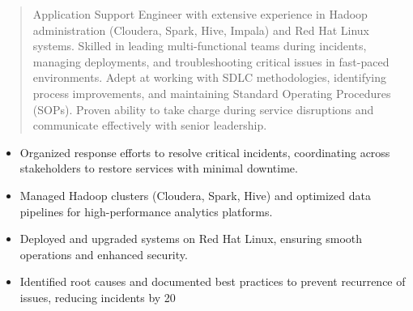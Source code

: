 



\makecvheader

\begin{quote}
  \noindent
  Application Support Engineer with extensive experience in Hadoop administration (Cloudera, Spark, Hive, Impala) and Red Hat Linux systems. Skilled in leading multi-functional teams during incidents, managing deployments, and troubleshooting critical issues in fast-paced environments. Adept at working with SDLC methodologies, identifying process improvements, and maintaining Standard Operating Procedures (SOPs). Proven ability to take charge during service disruptions and communicate effectively with senior leadership.
\end{quote}

\par\smallskip
\noindent
\begin{minipage}{20cm}
  \begin{minipage}{9.75cm}
    \begin{itemize}
      \item Organized response efforts to resolve critical incidents, coordinating across stakeholders to restore services with minimal downtime.
      \item Managed Hadoop clusters (Cloudera, Spark, Hive) and optimized data pipelines for high-performance analytics platforms.
    \end{itemize}
  \end{minipage}
  \hfill
  \begin{minipage}{9.75cm}
    \begin{itemize}
      \item Deployed and upgraded systems on Red Hat Linux, ensuring smooth operations and enhanced security.
      \item Identified root causes and documented best practices to prevent recurrence of issues, reducing incidents by 20%
    \end{itemize}
  \end{minipage}
\end{minipage}
\par\smallskip
\divider


